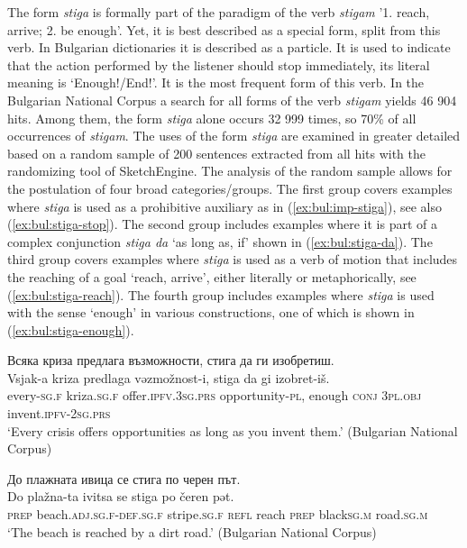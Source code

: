 \documentclass[output=paper,colorlinks=true, citecolor=brown]{langscibook}
\begin{document}
The form \textit{stiga} is formally part of the paradigm of the verb \textit{stigam} '1. reach, arrive; 2. be enough'. Yet, it is best described as a special form, split from this verb. In Bulgarian dictionaries it is described as a particle. It is used to indicate that the action performed by the listener should stop immediately, its literal meaning is `Enough!/End!'. It is the most frequent form of this verb. In the Bulgarian National Corpus a search for all forms of the verb \textit{stigam} yields 46 904 hits. Among them, the form \textit{stiga} alone occurs 32 999 times, so 70\% of all occurrences of \textit{stigam}. The uses of the form \textit{stiga} are examined in greater detailed based on a random sample of 200 sentences extracted from all hits with the randomizing tool of SketchEngine. The analysis of the random sample allows for the postulation of four broad categories/groups. The first group covers examples where \textit{stiga} is used as a prohibitive auxiliary as in (\ref{ex:bul:imp-stiga}), see also (\ref{ex:bul:stiga-stop}).  The second group includes examples where it is part of a complex conjunction \textit{stiga da} `as long as, if' shown in (\ref{ex:bul:stiga-da}). The third group covers examples where \textit{stiga} is used as a verb of motion that includes the reaching of a goal `reach, arrive', either literally or metaphorically, see (\ref{ex:bul:stiga-reach}). The fourth group includes examples where \textit{stiga} is used with the sense `enough' in various constructions, one of which is shown in (\ref{ex:bul:stiga-enough}). 

\ea \label{ex:bul:stiga-other}
    \ea Всяка криза предлага възможности, стига да ги изобретиш.\label{ex:bul:stiga-da}\\
        \gll Vsjak-a kriza predlaga vǝzmožnost-i, stiga da gi izobret-iš.\\
            every-\textsc{sg.f} kriza.\textsc{sg.f} offer.\textsc{ipfv.3sg.prs} opportunity-\textsc{pl}, enough \textsc{conj} \textsc{3pl.obj} invent.\textsc{ipfv}-\textsc{2sg.prs}\\
        \glt `Every crisis offers opportunities as long as you invent them.' (Bulgarian National Corpus)
    
    \ex  До плажната ивица се стига по черен път.\label{ex:bul:stiga-reach}\\
        \gll Do plažna-ta ivitsa se stiga po čeren pǝt.\\
            \textsc{prep} beach.\textsc{adj.sg.f}-\textsc{def.sg.f} stripe.\textsc{sg.f} \textsc{refl} reach \textsc{prep} black\textsc{sg.m} road.\textsc{sg.m}\\
        \glt `The beach is reached by a dirt road.' (Bulgarian National Corpus)
        
\end{document}
